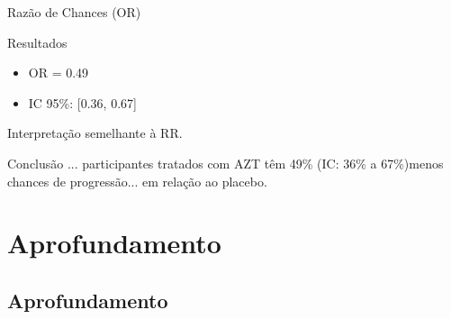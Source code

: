 \documentclass{beamer}
\begin{document}
\begin{frame}{\scriptsize Razão de Chances (OR)}
  \begin{exampleblock}{Resultados}
    \begin{itemize}
      \footnotesize
    \item OR = 0.49
    \item IC 95\%: [0.36, 0.67]
    \end{itemize}
  \end{exampleblock}
  \begin{center}
    Interpretação semelhante à RR.
  \end{center}
  \begin{exampleblock}{Conclusão}
    ... participantes tratados com AZT têm 49\% (IC: 36\% a 67\%)menos chances de progressão... em relação ao placebo.
  \end{exampleblock}
\end{frame}

\section{Aprofundamento}

\subsection{Aprofundamento}
\end{document}
